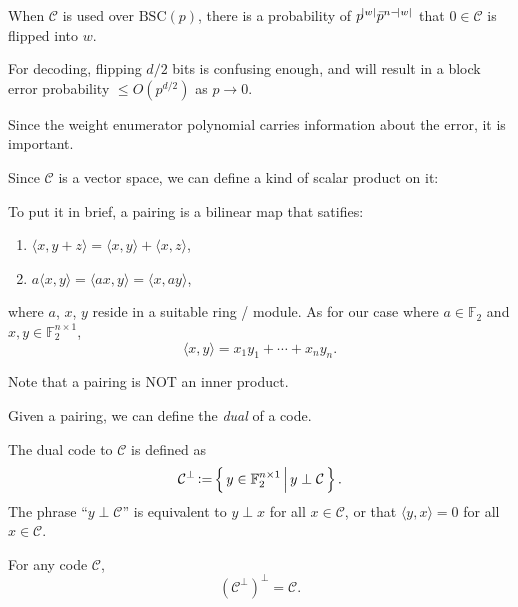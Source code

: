 \begin{remark}
    When $\mathcal{C}$ is used over $\mathrm{BSC}(p)$, there is a probability of $p^{\abs{w}}\bar{p}^{n-\abs{w}}$ that $0\in\mathcal{C}$ is flipped into $w$.
    
    For decoding, flipping $d/2$ bits is confusing enough, and will result in a block error probability $\le O(p^{d/2})$ as $p\rightarrow 0$.

    Since the weight enumerator polynomial carries information about the error, it is important.
\end{remark}

Since $\mathcal{C}$ is a vector space, we can define a kind of scalar product on it:
\begin{definition}[Pairing]
    To put it in brief, a pairing is a bilinear map that satifies:
    \begin{enumerate}
        \item $\langle x,y+z\rangle = \langle x,y\rangle + \langle x,z\rangle$,
        \item $a\langle x,y\rangle = \langle ax,y\rangle = \langle x,ay\rangle$,
    \end{enumerate}
    where $a$, $x$, $y$ reside in a suitable ring / module. As for our case where $a\in\mathbb{F}_2$ and $x,y\in\mathbb{F}_2^{n\times1}$,
    \begin{equation}
        \langle x,y\rangle = x_1y_1 + \cdots + x_ny_n.
    \end{equation}
\end{definition}
Note that a pairing is NOT an inner product.

Given a pairing, we can define the \textit{dual} of a code.
\begin{definition}
    The dual code to $\mathcal{C}$ is defined as
    \begin{equation}
        \mathcal{C}^\perp \operatorname{\vcentcolon=} \left\{\,{y\in\mathbb{F}_2^{n\times1}}\,\middle\vert\,{y\perp \mathcal{C}}\,\right\}.
    \end{equation}
    The phrase ``$y\perp\mathcal{C}$'' is equivalent to $y\perp x$ for all $x\in\mathcal{C}$, or that $\langle y,x\rangle = 0$ for all $x\in\mathcal{C}$.
\end{definition}

\begin{theorem}
    For any code $\mathcal{C}$,
    \begin{equation}
        (\mathcal{C}^\perp)^\perp = \mathcal{C}.
    \end{equation}
\end{theorem}

